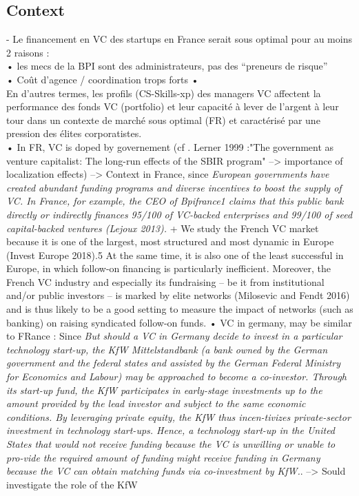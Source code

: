 \begin{itemize}
\begin{itemize}
\subsection{Context}

- Le financement en VC des startups en France serait sous optimal pour au moins 2 raisons : \\
•	les mecs de la BPI sont des administrateurs, pas des “preneurs de risque” \\
•	Coût d’agence / coordination trops forts •	\\
En d’autres termes, les profils (CS-Skills-xp) des managers VC affectent la performance des fonds VC (portfolio) et leur capacité à lever de l’argent à leur tour dans un contexte de marché sous optimal (FR) et caractérisé par une pression des élites corporatistes.\\
•	In FR, VC is doped by governement (cf . Lerner 1999 :"The government as venture capitalist: The long-run effects of the SBIR program" --> importance of localization effects) --> Context in France, since \citep{milosevic2020follow} \textit{European governments have created abundant funding programs and diverse incentives to boost the supply of VC. In France, for example, the CEO of Bpifrance1 claims that this public bank directly or indirectly finances 95/100 of VC-backed enterprises and 99/100 of seed capital-backed ventures (Lejoux 2013).} + We study the French VC market because it is one of the largest, most structured and most dynamic in Europe (Invest Europe 2018).5 At the same time, it is also one of the least successful in Europe, in which follow-on financing is particularly inefficient. Moreover, the French VC industry and especially its fundraising – be it from institutional and/or public investors – is marked by elite networks (Milosevic and Fendt 2016) and is thus likely to be a good setting to measure the impact of networks (such as banking) on raising syndicated follow-on funds.
•	VC in germany, may be similar to FRance : Since \citep{gruber2012minds} \textit{But should a VC in Germany decide to invest in a particular technology start-up, the KfW Mittelstandbank (a bank owned by the German government and the federal states and assisted by the German Federal Ministry for Economics and Labour) may be approached to become a co-investor. Through its start-up fund, the KfW participates in early-stage investments up to the amount provided by the lead investor and subject to the same economic conditions. By leveraging private equity, the KfW thus incen-tivizes private-sector investment in technology start-ups. Hence, a technology start-up in the United States that would not receive funding because the VC is unwilling or unable to pro-vide the required amount of funding might receive funding in Germany because the VC can obtain matching funds via co-investment by KfW.}. --> Sould investigate the role of the KfW


\end{itemize}
\end{itemize}
